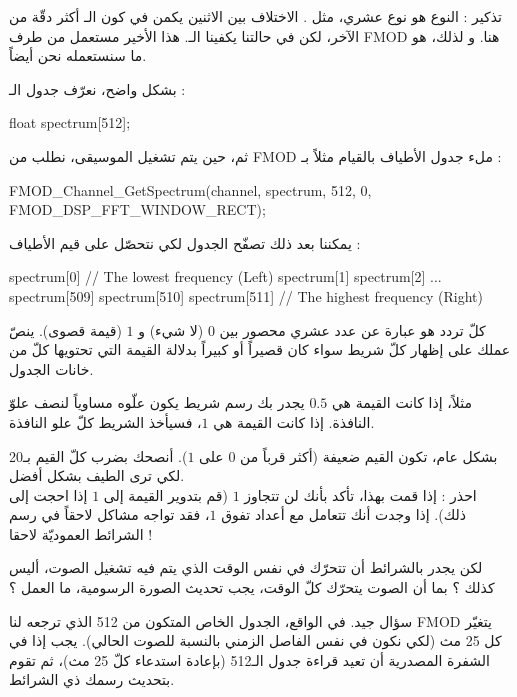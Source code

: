 \begin{information}
تذكير : النوع
هو نوع عشري، مثل
.
الاختلاف بين الاثنين يكمن في كون الـ
أكثر دقّة من الآخر، لكن في حالتنا يكفينا الـ.
هذا الأخير مستعمل من طرف
\textenglish{FMOD}
هنا. و لذلك، هو ما سنستعمله نحن أيضاً.
\end{information}

بشكل واضح، نعرّف جدول الـ :

\begin{Csource}
float spectrum[512];
\end{Csource}

ثم، حين يتم تشغيل الموسيقى، نطلب من 
\textenglish{FMOD}
ملء جدول الأطياف بالقيام مثلاً بـ :

\begin{Csource}
FMOD_Channel_GetSpectrum(channel, spectrum, 512, 0, FMOD_DSP_FFT_WINDOW_RECT);
\end{Csource}

يمكننا بعد ذلك تصفّح الجدول لكي نتحصّل على قيم الأطياف :

\begin{Csource}
spectrum[0] // The lowest frequency (Left)
spectrum[1]
spectrum[2]
...
spectrum[509]
spectrum[510]
spectrum[511] // The highest frequency (Right)
\end{Csource}

كلّ تردد هو عبارة عن عدد عشري محصور بين $ 0 $ (لا شيء) و $ 1 $ (قيمة قصوى). ينصّ عملك على إظهار كلّ شريط سواء كان قصيراً أو كبيراً بدلالة القيمة التي تحتويها كلّ من خانات الجدول.

مثلاً، إذا كانت القيمة هي $ 0.5 $ يجدر بك رسم شريط يكون علّوه مساوياً لنصف علوّ النافذة. إذا كانت القيمة هي $ 1 $، فسيأخذ الشريط كلّ علو النافذة.

بشكل عام، تكون القيم ضعيفة (أكثر قرباً من $ 0 $ على $ 1 $). أنصحك بضرب كلّ القيم بـ20 لكي ترى الطيف بشكل أفضل.\\
احذر : إذا قمت بهذا، تأكد بأنك لن تتجاوز $ 1 $ (قم بتدوير القيمة إلى $ 1 $ إذا احجت إلى ذلك). إذا وجدت أنك تتعامل مع أعداد تفوق $ 1 $، فقد تواجه مشاكل لاحقاً في رسم الشرائط العموديّة لاحقا !

\begin{question}
لكن يجدر بالشرائط أن تتحرّك في نفس الوقت الذي يتم فيه تشغيل الصوت، أليس كذلك ؟ بما أن الصوت يتحرّك كلّ الوقت، يجب تحديث الصورة الرسومية، ما العمل ؟
\end{question}

سؤال جيد. في الواقع، الجدول الخاص المتكون من 
512 
الذي ترجعه لنا
\textenglish{FMOD}
يتغيّر كل 25 مث (لكي نكون في نفس الفاصل الزمني بالنسبة للصوت الحالي). يجب إذا في الشفرة المصدرية أن تعيد قراءة جدول الـ512
 (بإعادة استدعاء
 كلّ 25 مث)، ثم تقوم بتحديث رسمك ذي الشرائط.
 
